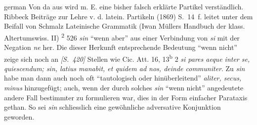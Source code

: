 \begin{otherlanguage*}{german}
Von da aus wird m. E. eine bisher falsch erklärte Partikel verständlich. Ribbeck Beiträge zur Lehre v. d. latein. Partikeln (1869) S.~14~f. leitet unter dem Beifall von Schmalz Lateinische Grammatik (Iwan Müllers Handbuch der klass. Altertumswiss. II) \textsuperscript{2} 526 \emph{sin} “wenn aber” aus einer Verbindung von \emph{si} mit der Negation \emph{ne} her. Die dieser Herkunft entsprechende Bedeutung “wenn nicht” zeige sich noch an \hypertarget{p420}{\emph{[S.~420]}}\label{p420} Stellen wie Cic. Att. 16, 13\textsuperscript{b} 2 \emph{si pares aeque inter se, quiescendum; sin, latius manabit, et quidem ad nos, deinde communiter}. Zu \emph{sin} habe man dann auch noch oft “tautologisch oder hinüberleitend” \emph{aliter, secus, minus} hinzugefügt; auch, wenn der durch solches \emph{sin} “wenn nicht” angedeutete andere Fall bestimmter zu formulieren war, dies in der Form einfacher Parataxis gethan. So sei \emph{sin} schliesslich eine gewöhnliche adversative Konjunktion geworden.


\end{otherlanguage*}
